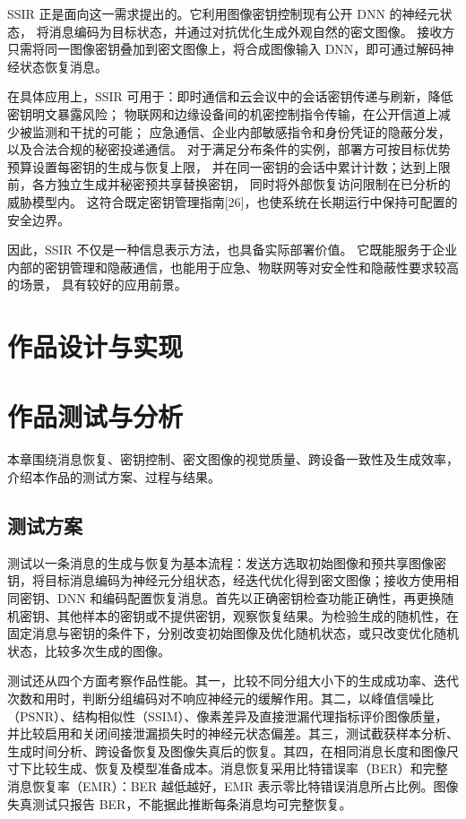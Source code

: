\documentclass[UTF8,a4paper,zihao=-4,fontset=windows,openany]{ctexbook}
\begin{document}
SSIR 正是面向这一需求提出的。它利用图像密钥控制现有公开 DNN 的神经元状态，
将消息编码为目标状态，并通过对抗优化生成外观自然的密文图像。
接收方只需将同一图像密钥叠加到密文图像上，将合成图像输入 DNN，即可通过解码神经状态恢复消息。

在具体应用上，SSIR 可用于：即时通信和云会议中的会话密钥传递与刷新，降低密钥明文暴露风险；
物联网和边缘设备间的机密控制指令传输，在公开信道上减少被监测和干扰的可能；
应急通信、企业内部敏感指令和身份凭证的隐蔽分发，以及合法合规的秘密投递通信。
对于满足分布条件的实例，部署方可按目标优势预算设置每密钥的生成与恢复上限，
并在同一密钥的会话中累计计数；达到上限前，各方独立生成并秘密预共享替换密钥，
同时将外部恢复访问限制在已分析的威胁模型内。
这符合既定密钥管理指南[26]，也使系统在长期运行中保持可配置的安全边界。

因此，SSIR 不仅是一种信息表示方法，也具备实际部署价值。
它既能服务于企业内部的密钥管理和隐蔽通信，也能用于应急、物联网等对安全性和隐蔽性要求较高的场景，
具有较好的应用前景。
\chapter{作品设计与实现}

\chapter{作品测试与分析}

本章围绕消息恢复、密钥控制、密文图像的视觉质量、跨设备一致性及生成效率，介绍本作品的测试方案、过程与结果。

\section{测试方案}

测试以一条消息的生成与恢复为基本流程：发送方选取初始图像和预共享图像密钥，将目标消息编码为神经元分组状态，经迭代优化得到密文图像；接收方使用相同密钥、DNN 和编码配置恢复消息。首先以正确密钥检查功能正确性，再更换随机密钥、其他样本的密钥或不提供密钥，观察恢复结果。为检验生成的随机性，在固定消息与密钥的条件下，分别改变初始图像及优化随机状态，或只改变优化随机状态，比较多次生成的图像。

测试还从四个方面考察作品性能。其一，比较不同分组大小下的生成成功率、迭代次数和用时，判断分组编码对不响应神经元的缓解作用。其二，以峰值信噪比（PSNR）、结构相似性（SSIM）、像素差异及直接泄漏代理指标评价图像质量，并比较启用和关闭间接泄漏损失时的神经元状态偏差。其三，测试截获样本分析、生成时间分析、跨设备恢复及图像失真后的恢复。其四，在相同消息长度和图像尺寸下比较生成、恢复及模型准备成本。消息恢复采用比特错误率（BER）和完整消息恢复率（EMR）：BER 越低越好，EMR 表示零比特错误消息所占比例。图像失真测试只报告 BER，不能据此推断每条消息均可完整恢复。
\end{document}
